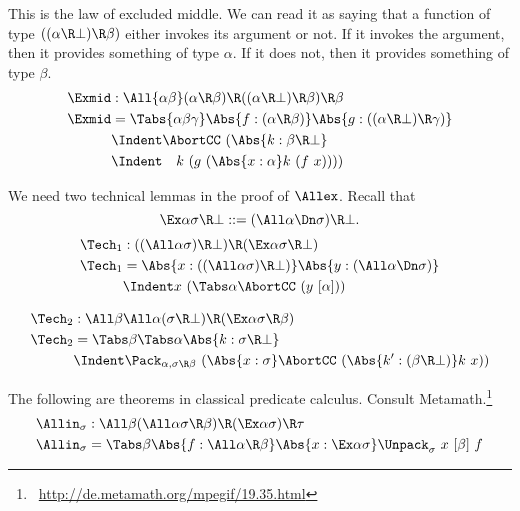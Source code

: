 \documentclass{amsart}
\begin{document}
This is the law of excluded middle. We can read it as saying that
a function of type $((\alpha\R\bot) \R \beta)$ either invokes its
argument or not. If it invokes the argument, then it provides
something of type $\alpha$. If it does not, then it provides
something of type $\beta$.
\begin{align*}
\Exmid & : \All{\alpha\beta}
  (\alpha \R \beta) \R
  ((\alpha\R\bot)\R\beta) \R
  \beta
\\
\Exmid & = \Tabs{\alpha\beta\gamma}
\Abs{f:(\alpha \R \beta)}
\Abs{g:((\alpha\R\bot)\R\gamma)}
\\&\Indent
\AbortCC~(\Abs{k:\beta\R\bot}
\\&\Indent\hspace{1em}
k~(g~(\Abs{x:\alpha}
k~(f~x))))
\end{align*}

We need two technical lemmas in the proof of $\Allex$. Recall
that
\[
\Ex\alpha\sigma\R\bot ::= (\All\alpha\Dn\sigma)\R\bot.
\]
\begin{align*}
\Tech_1 & : ((\All\alpha\sigma)\R\bot) \R (\Ex\alpha\sigma\R\bot)
\\
\Tech_1 & =
\Abs{x : ((\All\alpha\sigma) \R \bot)}
\Abs{y : (\All\alpha \Dn\sigma)}
\\&\Indent
x~(\Tabs\alpha \AbortCC~(y~[\alpha]))
\end{align*}

\begin{align*}
\Tech_2 & : \All\beta \All\alpha
  (\sigma\R\bot) \R (\Ex\alpha \sigma\R\beta)
\\
\Tech_2 & = \Tabs\beta \Tabs\alpha \Abs{k : \sigma\R\bot}
\\&\Indent
\Pack_{\alpha,\sigma\R\beta}~(\Abs{x:\sigma}
\AbortCC~(\Abs{k' : (\beta\R\bot)} k~x))
\end{align*}

The following are theorems in classical predicate calculus.
Consult Metamath.\footnote{
~\url{http://de.metamath.org/mpegif/19.35.html}
}
\begin{align*}
\Allin_\sigma & : \All\beta
  (\All\alpha \sigma\R\beta) \R
  (\Ex\alpha \sigma) \R \tau
  \\
\Allin_\sigma & = \Tabs\beta
\Abs{f : \All\alpha \R \beta}
\Abs{x : \Ex\alpha \sigma}
\Unpack_\sigma~x~[\beta]~f
\end{align*}
\end{document}
